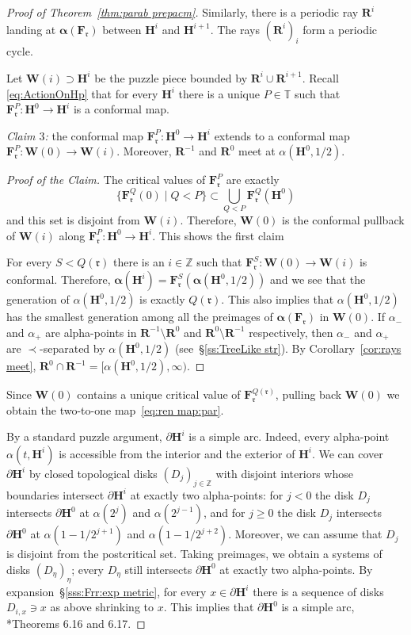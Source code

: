 \documentclass{amsart}
\newcommand{\1}{{\mathbb 1 }}
\newcommand\binfty{{\infty}}%
\newcommand\PT{\mathbb{ T}}
\newcommand{\bF}{{\mathbf F}}
\newcommand{\bW}{{\mathbf W}}
\newcommand{\bR}{{\mathbf R}}
\newcommand{\bH}{{\mathbf H}}
\newcommand{\rr}{\mathfrak{r}}
\newcommand{\Z}{\mathbb{Z}}
\theoremstyle{remark}
\numberwithin{equation}{section}
\theoremstyle{definition}
\newcommand{\balpha}{{\boldsymbol \alpha}}
\theoremstyle{nonumberbreak}
\begin{document}
\begin{proof}[Proof of Theorem~\ref{thm:parab prepacm}]
Similarly, there is a periodic ray $\bR^i$ landing at $\balpha(\bF_\rr)$ between $\bH^i$ and $\bH^{i+1}$. The rays $(\bR^i)_i$ form a periodic cycle.


Let $\bW(i)\supset \bH^i$ be the puzzle piece bounded by $\bR^i\cup \bR^{i+1}$. Recall \eqref{eq:ActionOnHp} that for every $\bH^i$ there is a unique $P\in \PT$ such that $\bF_\rr^P\colon \bH^0\to \bH^i$ is a conformal map.
 
\emph{Claim $3$:} the conformal map $\bF_\rr^P\colon \bH^0\to \bH^i$ extends to a conformal map 
$\bF_\rr^P\colon \bW(0)\to \bW(i)$. Moreover, $\bR^{-1}$ and $\bR^0$ meet at $\alpha(\bH^0,1/2)$.
\begin{proof}[Proof of the Claim]
The critical values of $\bF_\rr^P$ are exactly \[\{\bF_\rr^Q(0)\mid Q<P\}\subset \bigcup_{Q<P} \bF_\rr^Q(\bH^0) \] and this set is disjoint from $\bW(i)$. Therefore, $\bW(0)$ is the conformal pullback of $\bW(i)$ along $\bF_\rr^P\colon \bH^0\to \bH^i$. This shows the first claim

For every $S<Q(\rr)$ there is an $i\in \Z$ such that $\bF_\rr^S\colon \bW(0)\to \bW(i)$ is conformal. Therefore, $\balpha(\bH^i)=\bF_\rr^S(\balpha(\bH^0,1/2))$ and we see that the generation of $\alpha(\bH^0,1/2)$ is exactly $Q(\rr)$. This also implies that $\alpha(\bH^0,1/2)$ has the smallest generation among all the preimages of $\balpha(\bF_\rr)$ in $\bW(0)$. If $\alpha_-$ and $\alpha_+$ are alpha-points in $\bR^{-1}\setminus \bR^0$ and $\bR^{0}\setminus \bR^{-1}$ respectively, then $\alpha_-$ and $\alpha_+$ are $\prec$-separated by  $\alpha(\bH^0,1/2)$ (see~\S\ref{ss:TreeLike str}). By Corollary~\ref{cor:rays meet}, $\bR^{0}\cap  \bR^{-1}=[\alpha(\bH^0,1/2), \binfty)$. 
\end{proof}

 Since $\bW(0)$ contains a unique critical value of $\bF_\rr^{Q(\rr)}$, pulling back $\bW(0)$ we obtain the two-to-one map~\eqref{eq:ren map:par}.


By a standard puzzle argument, $\partial \bH^i$ is a simple arc. Indeed, every alpha-point $\alpha(t, \bH^i)$ is accessible from the interior and the exterior of $\bH^i$. We can cover $\partial \bH^i$ by closed topological disks $(D_j)_{j\in \Z}$ with disjoint interiors whose boundaries intersect $\partial \bH^i$ at exactly two alpha-points: for $j<0$ the disk $D_j$ intersects $\partial \bH^0$ at $\alpha(2^{j})$ and $\alpha(2^{j-1})$, and for $j\ge 0$ the disk $D_j$ intersects $\partial \bH^0$ at $\alpha(1-1/2^{j+1})$ and $\alpha(1-1/2^{j+2})$. Moreover, we can assume that $D_j$ is disjoint from the postcritical set. Taking preimages, we obtain a systems of disks $(D_\eta)_{\eta}$; every $D_\eta$ still intersects $\partial \bH^0$ at exactly two alpha-points. By expansion~\S\ref{sss:Frr:exp metric}, for every $x\in \partial \bH^i$ there is a sequence of disks $D_{i,x}\ni x$ as above shrinking to $x$. This implies that $\partial \bH^0$ is a simple arc, \cite{Na}*{Theorems 6.16 and 6.17}.


\end{proof}
\end{document}
